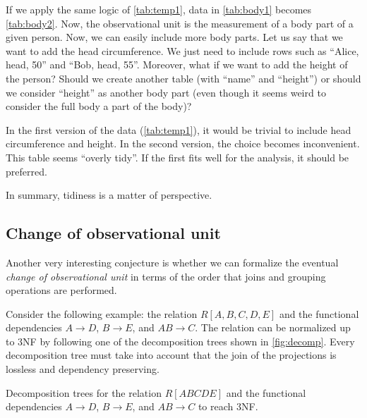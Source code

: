 If we apply the same logic of \cref{tab:temp1}, data in \cref{tab:body1} becomes
\cref{tab:body2}.  Now, the observational unit is the measurement of a body part of a
given person.  Now, we can easily include more body parts.  Let us say that we want to add
the head circumference.  We just need to include rows such as ``Alice, head, 50'' and
``Bob, head, 55''.  Moreover, what if we want to add the height of the person? Should we
create another table (with ``name'' and ``height'') or should we consider ``height''
as another body part (even though it seems weird to consider the full body a part of the
body)?

In the first version of the data (\cref{tab:temp1}), it would be trivial to include head
circumference and height.  In the second version, the choice becomes inconvenient.  This
table seems ``overly tidy''.  If the first fits well for the analysis, it should be
preferred.

In summary, tidiness is a matter of perspective.

\subsection{Change of observational unit}
\label{sub:change-unit}

Another very interesting conjecture is whether we can formalize the eventual \emph{change
of observational unit} in terms of the order that joins and grouping operations are
performed.

Consider the following example: the relation $R[A, B, C, D, E]$ and the functional
dependencies $A \to D$, $B \to E$, and $AB \to C$.  The relation can be normalized up to
3NF by following one of the decomposition trees shown in \cref{fig:decomp}.
Every decomposition tree must take into account that the join of the projections is
lossless and dependency preserving.

\begin{figurebox}[label=fig:decomp]{Decomposition trees for the relation $R[ABCDE]$ and
  the functional dependencies $A \to D$, $B \to E$, and $AB \to C$ to reach 3NF.}
  \centering
\end{figurebox}

